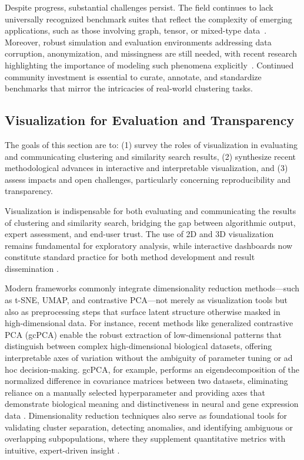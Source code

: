 \documentclass[sigconf]{acmart}
\begin{document}
Despite progress, substantial challenges persist. The field continues to lack universally recognized benchmark suites that reflect the complexity of emerging applications, such as those involving graph, tensor, or mixed-type data~\cite{ref27, ref28, ref36, ref46, ref110}. Moreover, robust simulation and evaluation environments addressing data corruption, anonymization, and missingness are still needed, with recent research highlighting the importance of modeling such phenomena explicitly~\cite{ref94, ref95, ref96, ref99}. Continued community investment is essential to curate, annotate, and standardize benchmarks that mirror the intricacies of real-world clustering tasks.

\subsection{Visualization for Evaluation and Transparency}

The goals of this section are to: (1) survey the roles of visualization in evaluating and communicating clustering and similarity search results, (2) synthesize recent methodological advances in interactive and interpretable visualization, and (3) assess impacts and open challenges, particularly concerning reproducibility and transparency.

Visualization is indispensable for both evaluating and communicating the results of clustering and similarity search, bridging the gap between algorithmic output, expert assessment, and end-user trust. The use of 2D and 3D visualization remains fundamental for exploratory analysis, while interactive dashboards now constitute standard practice for both method development and result dissemination \cite{ref53,ref58,ref79,ref86,ref91,ref92,ref94,ref95,ref99,ref115}.

Modern frameworks commonly integrate dimensionality reduction methods---such as t-SNE, UMAP, and contrastive PCA---not merely as visualization tools but also as preprocessing steps that surface latent structure otherwise masked in high-dimensional data. For instance, recent methods like generalized contrastive PCA (gcPCA) enable the robust extraction of low-dimensional patterns that distinguish between complex high-dimensional biological datasets, offering interpretable axes of variation without the ambiguity of parameter tuning or ad hoc decision-making. gcPCA, for example, performs an eigendecomposition of the normalized difference in covariance matrices between two datasets, eliminating reliance on a manually selected hyperparameter and providing axes that demonstrate biological meaning and distinctiveness in neural and gene expression data \cite{ref99}. Dimensionality reduction techniques also serve as foundational tools for validating cluster separation, detecting anomalies, and identifying ambiguous or overlapping subpopulations, where they supplement quantitative metrics with intuitive, expert-driven insight \cite{ref58,ref92,ref94,ref95}.
\end{document}
